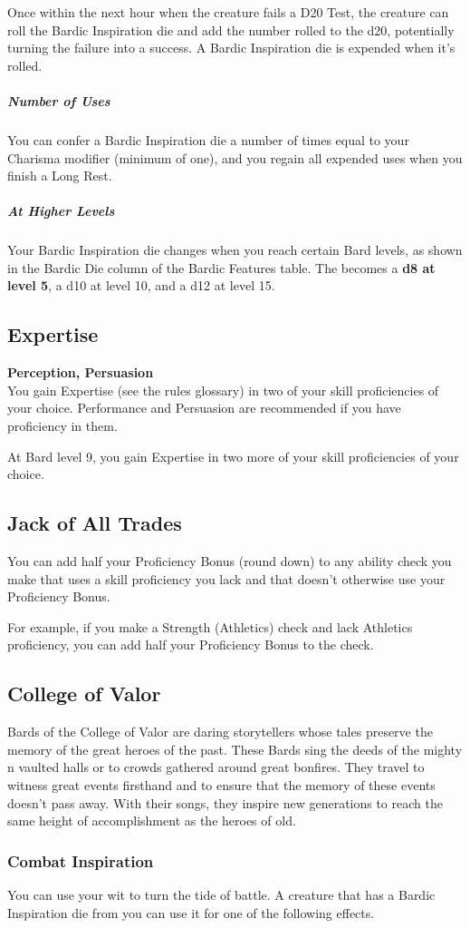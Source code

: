\documentclass[letterpaper,openany,oneside,twocolumn]{book}
\begin{document}
Once within the next hour when the creature fails a D20 Test, the creature can roll the Bardic Inspiration die and add the number rolled to the d20, potentially turning the failure into a success. A Bardic Inspiration die is expended when it's rolled.
\subparagraph*{Number of Uses}
You can confer a Bardic Inspiration die a number of times equal to your Charisma modifier (minimum of one), and you regain all expended uses when you finish a Long Rest.
\subparagraph*{At Higher Levels}
Your Bardic Inspiration die changes when you reach certain Bard levels, as shown in the Bardic Die column of the Bardic Features table. The becomes a \textbf{d8 at level 5}, a d10 at level 10, and a d12 at level 15.

\subsection*{Expertise}
\textbf{Perception, Persuasion}\\
You gain Expertise (see the rules glossary) in two of your skill proficiencies of your choice. Performance and Persuasion are recommended if you have proficiency in them.

At Bard level 9, you gain Expertise in two more of your skill proficiencies of your choice.

\subsection*{Jack of All Trades}
You can add half your Proficiency Bonus (round down) to any ability check you make that uses a skill proficiency you lack and that doesn't otherwise use your Proficiency Bonus.

For example, if you make a Strength (Athletics) check and lack Athletics proficiency, you can add half your Proficiency Bonus to the check.

\subsection*{College of Valor}
Bards of the College of Valor are daring storytellers whose tales preserve the memory of the great heroes of the past. These Bards sing the deeds of the mighty n vaulted halls or to crowds gathered around great bonfires. They travel to witness great events firsthand and to ensure that the memory of these events doesn't pass away. With their songs, they inspire new generations to reach the same height of accomplishment as the heroes of old.
\subsubsection*{Combat Inspiration}
You can use your wit to turn the tide of battle. A creature that has a Bardic Inspiration die from you can use it for one of the following effects.
\end{document}
